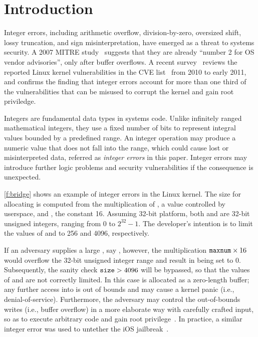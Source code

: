 \section{Introduction}
\label{s:intro}

Integer errors, including arithmetic overflow, division-by-zero,
oversized shift, lossy truncation, and sign misinterpretation, have
emerged as a threat to systems security.  A 2007 MITRE
study~\cite{christey:vuln} suggests that they are already ``number
2 for OS vendor advisories'', only after buffer overflows.  A recent
survey~\cite{chen:kbugs} reviews the reported Linux kernel
vulnerabilities in the CVE list~\cite{cve} from 2010 to early 2011,
and confirms the finding that integer errors account for more than
one third of the vulnerabilities that can be misused to corrupt the
kernel and gain root priviledge.

Integers are fundamental data types in systems code.  Unlike
infinitely ranged mathematical integers, they use a fixed number
of bits to represent integral values bounded by a predefined range.
An integer operation may produce a numeric value that does not fall
into the range, which could cause lost or misinterpreted data, referred
as \emph{integer errors} in this paper.  Integer errors may introduce
further logic problems and security vulnerabilities if the consequence
is unexpected.
\fi

\autoref{f:bridge} shows an example of integer errors in the Linux
kernel.  The size for allocating  is computed from the
multiplication of , a value controlled by userspace,
and , the constant 16.  Assuming
32-bit platform, both  and  are 32-bit unsigned
integers, ranging from 0 to $2^{32} - 1$.
The developer's intention is to limit the values of 
 and  to 256 and 4096, respectively.

If an adversary supplies a large , say
, however, the multiplication $\texttt{maxnum} \times 16$ would
overflow the 32-bit unsigned integer range and result in 
being set to 0.  Subsequently, the sanity check $\texttt{size} > 4096$
will be bypassed, so that the values of  and 
are not correctly limited.  In this case  is allocated as
a zero-length buffer; any further access into  is out of
bounds and may cause a kernel panic (i.e., denial-of-service).
Furthermore, the adversary may control the out-of-bounds writes
(i.e., buffer overflow) in a more elaborate way with carefully
crafted input, so as to execute arbitrary code and gain root
privilege~\cite[CVE-2006-5751]{cve}.  In practice, a similar integer
error was used to untether the iOS jailbreak~\cite{esser:ios}.

